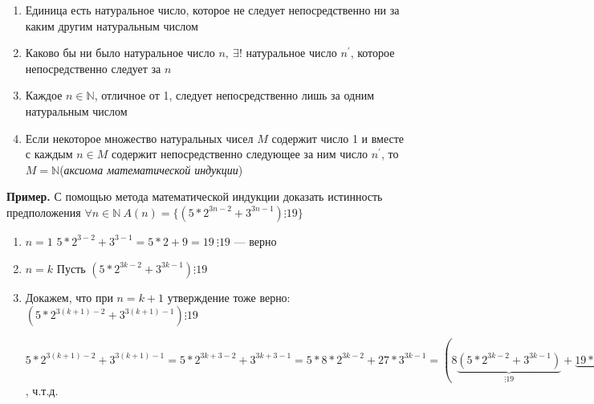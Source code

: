 \documentclass{article}
\begin{document}
    \begin{enumerate}
        \item Единица есть натуральное число, которое не следует непосредственно ни за каким другим натуральным числом
        \item Каково бы ни было натуральное число \(n,\ \exists!\) натуральное число \(n^\prime\), которое непосредственно следует за \(n\)
        \item Каждое \(n \in \mathbb{N}\), отличное от 1, следует непосредственно лишь за одним натуральным числом
        \item Если некоторое множество натуральных чисел \(M\) содержит число 1 и вместе с каждым \(n \in M\) содержит непосредственно следующее за ним число \(n^\prime\), то \(M = \mathbb{N}\)(\textit{аксиома математической индукции})
    \end{enumerate}

    \textbf{Пример.} С помощью метода математической индукции доказать истинность предположения \(\forall n \in \mathbb{N}\ A(n) = \{(5*2^{3n-2} + 3^{3n-1}) \vdots 19\}\)
    \begin{enumerate}
        \item \(n=1\) \quad \(5*2^{3-2} + 3^{3-1} = 5*2 + 9 = 19\ \vdots 19\) --- верно
        \item \(n=k\) \quad Пусть \((5*2^{3k-2} + 3^{3k-1}) \vdots 19\)
        \item Докажем, что при \(n = k+1\) утверждение тоже верно: \((5 * 2^{3(k+1)-2} + 3^{3(k+1)-1}) \vdots 19\)
        
        \(5 * 2^{3(k+1)-2} + 3^{3(k+1)-1} = 5 * 2^{3k+3-2} + 3^{3k+3-1} = 5 * 8 * 2^{3k-2} + 27 * 3^{3k-1} = (8 \underset{\vdots 19}{\underbrace{(5*2^{3k-2} + 3^{3k-1})}} + \underset{\vdots 19}{\underbrace{19 * 3^{3k-1}}})\ \vdots 19\), ч.т.д.
    \end{enumerate}
\end{document}
